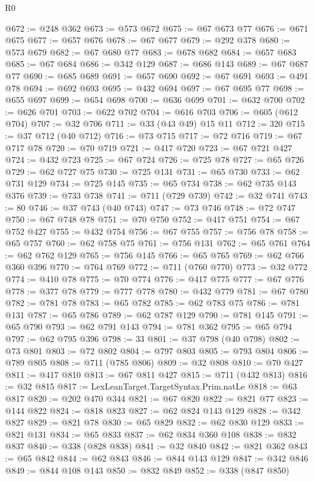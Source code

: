 \begin{lexlean}{R0}
\begin{coremodule}
@672 := @248 @362
@673 := @573 @672
@675 := @67 @673 @77
@676 := @671 @675
@677 := @657 @676
@678 := @67 @677
@679 := @292 @378
@680 := @573 @679
@682 := @67 @680 @77
@683 := @678 @682
@684 := @657 @683
@685 := @67 @684
@686 := @342 @129
@687 := @686 @143
@689 := @67 @687 @77
@690 := @685 @689
@691 := @657 @690
@692 := @67 @691
@693 := @491 @78
@694 := @692 @693
@695 := @432 @694
@697 := @67 @695 @77
@698 := @655 @697
@699 := @654 @698
@700 := @636 @699
@701 := @632 @700
@702 := @626 @701
@703 := @622 @702
@704 := @616 @703
@706 := @605 (@612 @704)
@707 := @32 @706
@711 := @33 (@43 @49) @15 @11
@712 := 320
@715 := @37 @712 (@40 @712)
@716 := @73 @715
@717 := @72 @716
@719 := @67 @717 @78
@720 := @70 @719
@721 := @417 @720
@723 := @67 @721 @427
@724 := @432 @723
@725 := @67 @724
@726 := @725 @78
@727 := @65 @726
@729 := @62 @727 @75
@730 := @725 @131
@731 := @65 @730
@733 := @62 @731 @129
@734 := @725 @145
@735 := @65 @734
@738 := @62 @735 @143 @376
@739 := @733 @738
@741 := @711 (@729 @739)
@742 := @32 @741
@743 := 80
@746 := @37 @743 (@40 @743)
@747 := @73 @746
@748 := @72 @747
@750 := @67 @748 @78
@751 := @70 @750
@752 := @417 @751
@754 := @67 @752 @427
@755 := @432 @754
@756 := @67 @755
@757 := @756 @78
@758 := @65 @757
@760 := @62 @758 @75
@761 := @756 @131
@762 := @65 @761
@764 := @62 @762 @129
@765 := @756 @145
@766 := @65 @765
@769 := @62 @766 @360 @396
@770 := @764 @769
@772 := @711 (@760 @770)
@773 := @32 @772
@774 := @410 @78
@775 := @70 @774
@776 := @417 @775
@777 := @67 @776
@778 := @377 @78
@779 := @777 @778
@780 := @432 @779
@781 := @67 @780
@782 := @781 @78
@783 := @65 @782
@785 := @62 @783 @75
@786 := @781 @131
@787 := @65 @786
@789 := @62 @787 @129
@790 := @781 @145
@791 := @65 @790
@793 := @62 @791 @143
@794 := @781 @362
@795 := @65 @794
@797 := @62 @795 @396
@798 := 33
@801 := @37 @798 (@40 @798)
@802 := @73 @801
@803 := @72 @802
@804 := @797 @803
@805 := @793 @804
@806 := @789 @805
@808 := @711 (@785 @806)
@809 := @32 @808
@810 := @70 @427
@811 := @417 @810
@813 := @67 @811 @427
@815 := @711 (@432 @813)
@816 := @32 @815
@817 := LexLeanTarget.TargetSyntax.Prim.natLe
@818 := @63 @817
@820 := @202 @470 @344
@821 := @67 @820
@822 := @821 @77
@823 := @144 @822
@824 := @818 @823
@827 := @62 @824 @143 @129
@828 := @342 @827
@829 := @821 @78
@830 := @65 @829
@832 := @62 @830 @129
@833 := @821 @131
@834 := @65 @833
@837 := @62 @834 @360 @108
@838 := @832 @837
@840 := @338 (@828 @838)
@841 := @32 @840
@842 := @821 @362
@843 := @65 @842
@844 := @62 @843
@846 := @844 @143 @129
@847 := @342 @846
@849 := @844 @108 @143
@850 := @832 @849
@852 := @338 (@847 @850)

\end{coremodule}
\end{lexlean}
